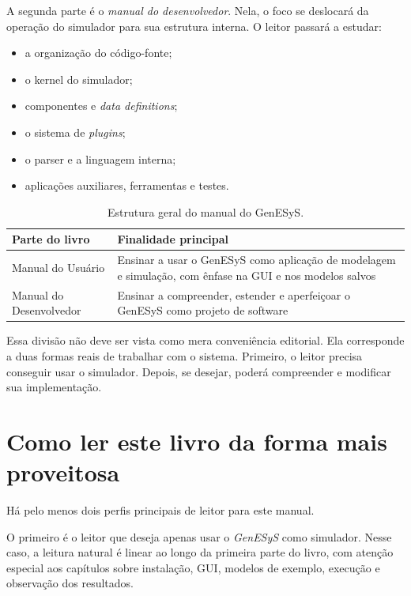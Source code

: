 A segunda parte é o \textit{manual do desenvolvedor}. Nela, o foco se deslocará da operação do simulador para sua estrutura interna. O leitor passará a estudar:
\begin{itemize}
    \item a organização do código-fonte;
    \item o kernel do simulador;
    \item componentes e \textit{data definitions};
    \item o sistema de \textit{plugins};
    \item o parser e a linguagem interna;
    \item aplicações auxiliares, ferramentas e testes.
\end{itemize}

\begin{table}[htbp]
    \centering
    \caption{Estrutura geral do manual do GenESyS.}
    \label{tab:cap1_estrutura_manual}
    \small
    \begin{tabular}{|p{3.0cm}|p{8.4cm}|}
        \hline
        \textbf{Parte do livro} & \textbf{Finalidade principal} \\
        \hline
        Manual do Usuário & Ensinar a usar o GenESyS como aplicação de modelagem e simulação, com ênfase na GUI e nos modelos salvos \\
        \hline
        Manual do Desenvolvedor & Ensinar a compreender, estender e aperfeiçoar o GenESyS como projeto de software \\
        \hline
    \end{tabular}
\end{table}

Essa divisão não deve ser vista como mera conveniência editorial. Ela corresponde a duas formas reais de trabalhar com o sistema. Primeiro, o leitor precisa conseguir usar o simulador. Depois, se desejar, poderá compreender e modificar sua implementação.

\section{Como ler este livro da forma mais proveitosa}
\label{sec:cap1_como_ler_livro}

Há pelo menos dois perfis principais de leitor para este manual.

O primeiro é o leitor que deseja apenas usar o \textit{GenESyS} como simulador. Nesse caso, a leitura natural é linear ao longo da primeira parte do livro, com atenção especial aos capítulos sobre instalação, GUI, modelos de exemplo, execução e observação dos resultados.

